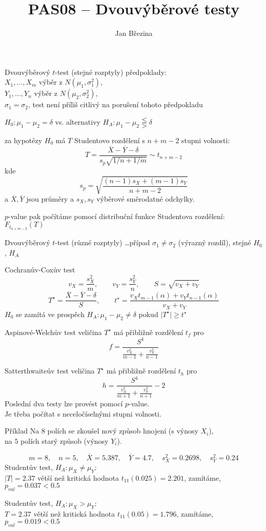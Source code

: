 \documentclass[smaller]{beamer}
\title{PAS08 -- Dvouvýběrové testy}
\author{Jan B\v rezina}
\institute %
{
  Technical University of Liberec
}
\def\abs#1{\lvert#1\rvert}
\def\ol#1{\overline{#1}}
\def\blue#1{{\usebeamercolor[fg]{my blue} #1}}
\def\xskip{{\vspace{2ex}}}
\begin{document}
\begin{frame}
  \titlepage
\end{frame}

\def\df{\usebeamercolor[fg]{my red}\it}
\begin{frame}{Dvouvýběrový $t$-test (stejné rozptyly)}
předpoklady:\\
$X_1, \dots ,X_m$ výběr z $N(\mu_1,\sigma_1^2)$,\\
$Y_1, \dots ,Y_n$ výběr z $N(\mu_2,\sigma_2^2)$,\\
\blue{$\sigma_1 = \sigma_2$}, test není příliš citlivý na porušení tohoto předpokladu

\xskip
$H_0: \mu_1 - \mu_2  = \delta$ vs. alternativy $H_A: \mu_1 - \mu_2  \lesseqqgtr \delta$

\xskip
za hypotézy $H_0$ má $T$ Studentovo rozdělení s $n+m-2$ stupni volnosti:
\[
 T = \frac{\ol{X} - \ol{Y} - \delta}{s_p\sqrt{1/n +1/m}} \sim t_{n+m-2}
\]
kde
\[
   s_p = \sqrt{\frac{(n-1)s_X + (m-1)s_Y}{n+m-2}}
\]
a $\ol{X}, \ol{Y}$ jsou průměry a $s_X, s_Y$ výběrové směrodatné odchylky.

$p$-value pak počítáme pomocí distribuční funkce Studentova rozdělení: $F_{t_{n+m-2}}(T)$
\end{frame}

\begin{frame}{Dvouvýběrový $t$-test (různé rozptyly)}
\dots případ $\sigma_1 \ne \sigma_2$ (výrazný rozdíl),
stejné $H_0$, $H_A$

\blue{Cochranův-Coxův test}
    \[
      v_X = \frac{s_X^2}{m},\qquad v_Y = \frac{s_Y^2}{n},\qquad S = \sqrt{v_X + v_Y}
    \]
    \[
      T^\star = \frac{\ol{X} - \ol{Y} -\delta}{S},\qquad t^\star = \frac{v_X t_{m-1}(\alpha) + v_Y t_{n-1}(\alpha)}{v_X +v_Y}
    \]
    $H_0$ se zamítá ve prospěch $H_A: \mu_1 -\mu_2 \ne\delta$ pokud $\abs{T^\star} \ge t^\star$

\blue{Aspinové-Welchův test}
   veličina $T^\star$ má přibližně rozdělení $t_f$ pro 
   \[
      f=\frac{S^4}{\frac{v_X^2}{m-1} + \frac{v_Y^2}{n-1}}
   \]

\blue{Satterthwaiteův test}
   veličina $T^\star$ má přibližně rozdělení $t_h$ pro 
   \[
      h=\frac{S^4}{\frac{v_X^2}{m+1} + \frac{v_Y^2}{n+1}} -2
   \]
Poslední dva testy lze provést pomocí $p$-value.\\
Je třeba počítat s neceločíselnými stupni volnosti.
\end{frame}

\begin{frame}{Příklad}
Na $8$ polích se zkoušel nový způsob hnojení (s výnosy $X_i$),\\ 
na $5$ polích starý způsob (výnosy $Y_i$).

\[
 m=8,\quad n=5,\quad \ol{X}=5.387,\quad \ol{Y}=4.7,\quad s_X^2=0.2698,\quad s_Y^2=0.24
\]
Studentův test, $H_A: \mu_X\ne \mu_Y$: \\
$\abs{T}=2.37$ větší než kritická hodnota $t_{11}(0.025) =2.201$, zamítáme, $p_{val} = 0.037 < 0.5$

\xskip
Studentův test,  $H_A: \mu_X > \mu_Y$: \\
$T=2.37$ větší než kritická hodnota $t_{11}(0.05) =1.796$, zamítáme, $p_{val} = 0.019 < 0.5$
\end{frame}
\end{document}
